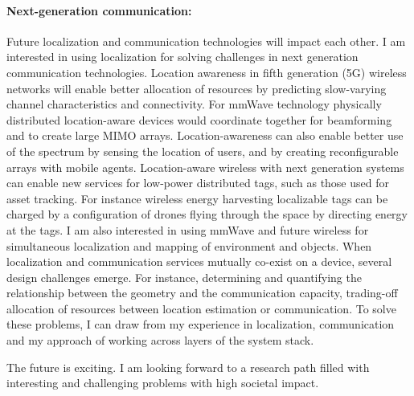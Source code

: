 \documentclass[10pt]{article}
\begin{document}
\paragraph{Next-generation communication: }
Future localization and communication technologies will impact each other. 
I am interested in using localization for solving challenges in next generation communication technologies. %
Location awareness in fifth generation (5G) wireless networks will enable better allocation of resources by predicting slow-varying channel characteristics and connectivity. %
For mmWave technology physically distributed location-aware devices would coordinate together for beamforming and to create large MIMO arrays. 
Location-awareness can also enable better use of the spectrum by sensing the location of users, and by creating reconfigurable arrays with mobile agents. 
Location-aware wireless with next generation systems can enable new services for low-power distributed tags, such as those used for asset tracking. 
For instance wireless energy harvesting localizable tags can be charged by a configuration of drones flying through the space by directing energy at the tags. 
I am also interested in using mmWave and future wireless for simultaneous localization and mapping of environment and objects. 
When localization and communication services mutually co-exist on a device, several design challenges emerge. For instance, determining and quantifying the relationship between the geometry and the communication capacity, trading-off allocation of resources between location estimation or communication. To solve these problems, I can draw from my experience in localization, communication and my approach of working across layers of the system stack. 

The future is exciting. I am looking forward to a research path filled with interesting and challenging problems with high societal impact. %

\end{document}
